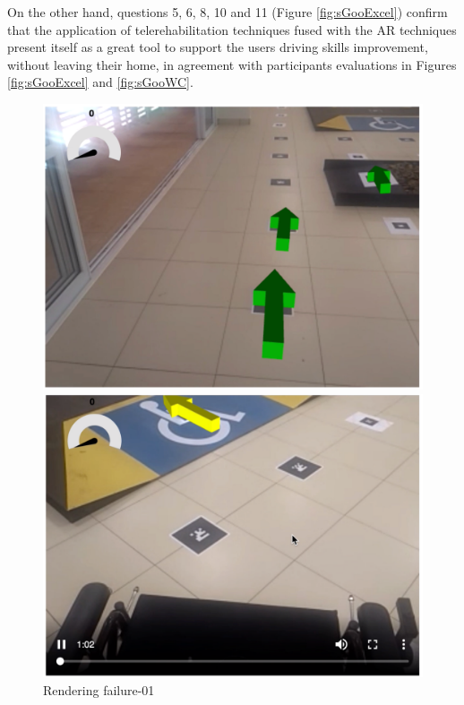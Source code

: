 On the other hand, questions 5, 6, 8, 10 and 11  (Figure \ref{fig:sGooExcel})  confirm that the application of telerehabilitation techniques fused with the AR techniques present  itself as a great tool to support the users driving skills improvement, without leaving their home, in agreement with participants evaluations in Figures \ref{fig:sGooExcel} and \ref{fig:sGooWC}. 

\begin{figure}[!htbp]
\center
\begin{minipage}{0.495\linewidth}
\center
\captionsetup{justification=centering,margin=0.5cm,font=small}
\includegraphics[width=1\linewidth]{img/cap6/errorRender01}
\caption{Rendering failure-01} \label{fig:errorRender01}
\end{minipage}
\begin{minipage}{0.495\linewidth}
\center
\captionsetup{justification=centering,margin=0cm,font=small}
\includegraphics[width=1\linewidth]{img/cap6/errorRender02}

\end{minipage}
\end{figure}
